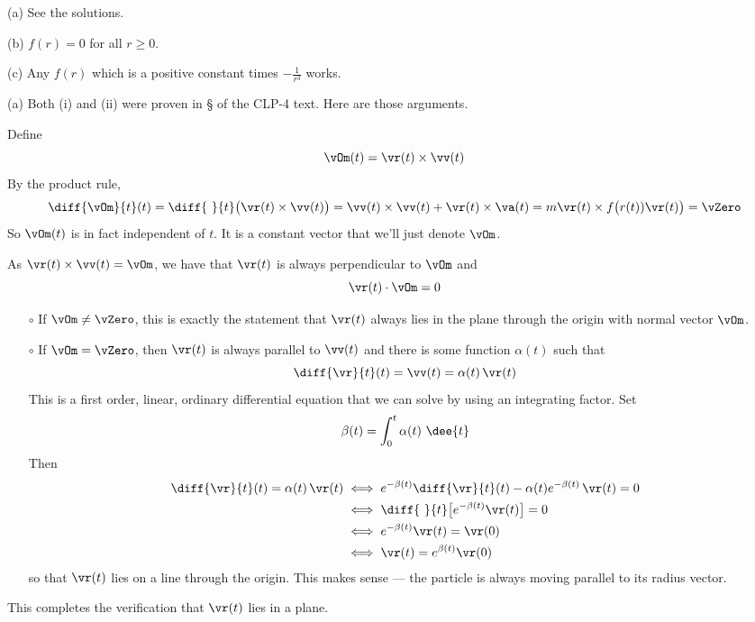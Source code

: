 \begin{answer}
(a) See the solutions. 

(b) $f(r)=0$ for all $r\ge 0$.

(c) Any $f(r)$ which is a positive constant times $-\frac{1}{r^3}$ works.
\end{answer}

\begin{solution} (a)
Both (i) and (ii) were proven in \S{} 
of the CLP-4 text. Here are those arguments.

Define
\begin{equation*}
\vOm(t) = \vr(t)\times\vv(t)
\end{equation*}
By the product rule,
\begin{equation*}
\diff{\vOm}{t}(t) =\diff{\ }{t}\big(\vr(t)\times\vv(t)\big)
=\vv(t)\times\vv(t) + \vr(t)\times\va(t)
=m\vr(t)\times f\big(r(t))\vr(t)\big)
=\vZero
\end{equation*}
So $\vOm(t)$ is in fact independent of $t$. It is a constant vector that
we'll just denote $\vOm$. 

As $\vr(t)\times\vv(t)=\vOm$, we have that
$\vr(t)$ is always perpendicular to $\vOm$ and
\begin{equation*}
\vr(t)\cdot\vOm =0
\end{equation*}
\begin{itemize}\itemsep1pt \parskip0pt  %
\item[$\circ$]
If $\vOm\ne \vZero$, this is exactly the statement that $\vr(t)$ always 
lies in the plane through the origin with normal vector $\vOm$.
\item[$\circ$]
If $\vOm=\vZero$, then $\vr(t)$ is always parallel to $\vv(t)$ and there
is some function $\alpha(t)$ such that
\begin{equation*}
\diff{\vr}{t}(t) = \vv(t) = \alpha(t)\,\vr(t)
\end{equation*}
This is a first order, linear, ordinary differential equation that we can solve
by using an integrating factor. Set
\begin{equation*}
\beta(t) = \int_0^t\alpha(t)\ \dee{t}
\end{equation*}
Then
\begin{align*}
\diff{\vr}{t}(t) = \alpha(t)\,\vr(t)
&\iff e^{-\beta(t)} \diff{\vr}{t}(t) -\alpha(t)e^{-\beta(t)}\,\vr(t)=0\\
&\iff \diff{\ }{t}\big[e^{-\beta(t)}\vr(t)\big] = 0\\
&\iff e^{-\beta(t)}\vr(t) = \vr(0)\\
&\iff \vr(t) =  e^{\beta(t)}\vr(0)
\end{align*}
so that $\vr(t)$ lies on a line through the origin. This makes sense ---
the particle is always moving parallel to its radius vector.
\end{itemize}
This completes the verification that $\vr(t)$ lies in a plane.


\end{solution}

